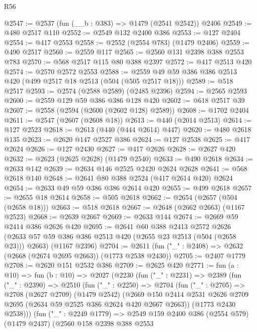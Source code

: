 \begin{lexlean}{R56}
\begin{coremodule}
@2547 := @2537 (fun (__b : @383) => @1479 (@2541 @2542)) @2406
@2549 := @480 @2517 @110
@2552 := @2549 @132 @2400 @386
@2553 := @127 @2404
@2554 := @417 @2553
@2558 := @2552 (@2554 @783) (@1479 @2406)
@2559 := @490 @2517
@2560 := @2559 @117
@2565 := @2560 @131 @2398 @388 @2553 @783
@2570 := @568 @2517 @115 @80 @388 @2397
@2572 := @417 @2513 @420
@2574 := @2570 @2572 @2553
@2588 := @2559 @49 @59 @386 @386 @2513 @420 (@499 @2517 @18 @2513 (@504 (@505 @2517 @18)))
@2589 := @518 @2517
@2593 := @2574 (@2588 @2589) (@2485 @2396)
@2594 := @2565 @2593
@2600 := @2559 @129 @59 @386 @386 @128 @420
@2602 := @618 @2517 @39
@2607 := @2558 (@2594 (@2600 (@2602 @128) @2589))
@2608 := @1702 @2404
@2611 := @2547 (@2607 (@2608 @18))
@2613 := @440 (@2014 @2513)
@2614 := @127 @2523
@2618 := @2613 (@440 (@444 @2614) @447)
@2620 := @480 @2618 @135
@2623 := @2620 @147 @2527 @386
@2624 := @127 @2538
@2625 := @417 @2624
@2626 := @127 @2430
@2627 := @417 @2626
@2628 := @2627 @420
@2632 := @2623 (@2625 @2628) (@1479 @2540)
@2633 := @490 @2618
@2634 := @2633 @142
@2639 := @2634 @146 @2525 @2420 @2624 @2628
@2641 := @568 @2618 @140
@2648 := @2641 @80 @388 @2524 (@417 @2614 @420) @2624
@2654 := @2633 @49 @59 @386 @386 @2614 @420
@2655 := @499 @2618
@2657 := @2655 @18 @2614
@2658 := @505 @2618
@2662 := @2654 (@2657 (@504 (@2658 @18)))
@2663 := @518 @2618
@2667 := @2648 (@2662 @2663) (@1167 @2523)
@2668 := @2639 @2667
@2669 := @2633 @144
@2674 := @2669 @59 @2414 @386 @2626 @420
@2695 := @2641
    @60
    @388
    @2413
    @2572
    @2626
    (@2633 @57 @59 @386 @386 @2513 @420 (@2655 @23 @2513 (@504 (@2658 @23))) @2663)
    (@1167 @2396)
@2704 := @2611 (fun ("_" : @2408) => @2632 (@2668 (@2674 @2695 @2663)) (@1773 @2538 @2430))
@2705 := @2407 @1779
@2708 := @2620 @151 @2532 @386
@2709 := @2625 @420
@2771 := fun (a : @10) =>
  fun (b : @10) =>
  @2027
    (@2230
      (fun ("_" : @2231) =>
      @2389
        (fun ("_" : @2390) =>
        @2510
          (fun ("_" : @2250) =>
          @2704
            (fun ("_" : @2705) =>
            @2708
              (@2627 @2709)
              (@1479 @2542)
              (@2669
                @150
                @2414
                @2531
                @2626
                @2709
                @2695
                (@2634 @59 @2525 @386 @2624 @420 @2667 @2663))
              (@1773 @2430 @2538)))
          (fun ("_" : @2249 @1779) =>
          @2549
            @159
            @2400
            @386
            (@2554 @579)
            (@1479 @2437)
            (@2560
              @158
              @2398
              @388
              @2553

\end{coremodule}
\end{lexlean}
